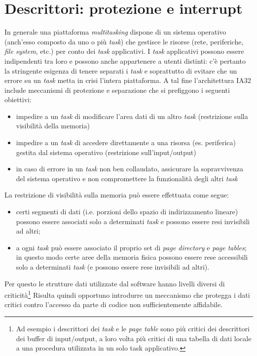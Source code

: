 \chapter{Descrittori: protezione e interrupt}
\label{cha:protezione}

In generale una piattaforma \textit{multitasking} dispone di un sistema operativo (anch'esso composto da uno o più \textit{task}) che gestisce le risorse (rete, periferiche, \textit{file system}, etc.) per conto dei \textit{task} applicativi. I \textit{task} applicativi possono essere indipendenti tra loro e possono anche appartenere a utenti distinti: c'è pertanto la stringente esigenza di tenere separati i \textit{task} e soprattutto di evitare che un errore su un \textit{task} metta in crisi l'intera piattaforma. A tal fine l'architettura IA32 include meccanismi di protezione e separazione che si prefiggono i seguenti obiettivi: 
\begin{itemize}
\item impedire a un \textit{task} di modificare l'area dati di un altro \textit{task} (restrizione sulla visibilità della memoria)
\item impedire a un \textit{task} di accedere direttamente a una risorsa (es. periferica)
gestita dal sistema operativo (restrizione sull'input/output)
\item  in caso di errore in un \textit{task} non ben collaudato, assicurare la sopravvivenza del
sistema operativo e non compromettere la funzionalità degli altri \textit{task}
\end{itemize}
La restrizione di visibilità sulla memoria può essere effettuata come segue:
\begin{itemize}
\item  certi segmenti di dati (i.e. porzioni dello spazio di indirizzamento lineare)
possono essere associati solo a determinati \textit{task} e possono essere resi
invisibili ad altri;
\item a ogni \textit{task} può essere associato il proprio set di\textit{ page directory} e \textit{page tables};
in questo modo certe aree della memoria fisica possono essere rese accessibili
solo a determinati \textit{task} (e possono essere rese invisibili ad altri).
\end{itemize}

Per questo le strutture dati utilizzate dal software hanno livelli diversi di criticità\footnote{Ad esempio i descrittori dei \textit{task} e le\textit{ page table} sono più critici dei descrittori dei buffer di input/output, a loro volta più critici di una tabella di dati locale a una procedura utilizzata in un solo task applicativo.}
Risulta quindi opportuno introdurre un meccanismo che protegga i dati critici contro l'accesso da parte di codice non sufficientemente affidabile.

